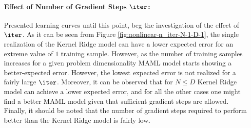 \paragraph{Effect of Number of Gradient Steps $\iter$:} Presented learning curves until this point, beg the investigation of the effect of $\iter$.  As it can be seen from Figure \ref{fig:nonlinear-n_iter-N-1-D-1}, the single realization of the Kernel Ridge model can have a lower expected error for an extreme value of $1$ training sample. However, as the number of training samples increases for a given problem dimensionality MAML model starts showing a better-expected error. However, the lowest expected error is not realized for a fairly large $\iter$. Moreover, it can be observed that for $N\leq D$ Kernel Ridge model can achieve a lower expected error, and for all the other cases one might find a better MAML model given that sufficient gradient steps are allowed. Finally, it should be noted that the number of gradient steps required to perform better than the Kernel Ridge model is fairly low.

